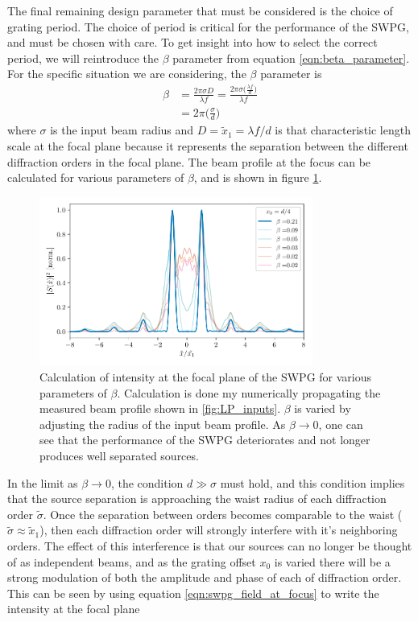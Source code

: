 The final remaining design parameter that must be considered is the choice of grating period. The choice of period is critical for the performance of the SWPG, and must be chosen with care.  To get insight into how to select the correct period, we will reintroduce the $\beta$ parameter from equation \ref{eqn:beta_parameter}.  For the specific situation we are considering, the $\beta$ parameter is
\begin{equation}
\label{eqn:beta_swpg}
	\begin{aligned}
		\beta &= \frac{2\pi \sigma D}{\lambda f} = \frac{2\pi\sigma\big(\frac{\lambda f}{d}\big)}{\lambda f}\\
		&= 2\pi\bigg(\frac{\sigma}{d}\bigg)
	\end{aligned}
\end{equation}
where $\sigma$ is the input beam radius and $D=\tilde{x}_1=\lambda f /d$ is that characteristic length scale at the focal plane because it represents the separation between the different diffraction orders in the focal plane.  The beam profile at the focus can be calculated for various parameters of $\beta$, and is shown in figure \ref{fig:intensity_vs_beta}.
\begin{figure}
	\centering
	\includegraphics[width=0.8\textwidth]{figures/Two_source/focus_intensity_beta_sigma.pdf}
	\caption[Intensity profiles at focal plane of a $0-\pi$ SWPG for various $\beta$ parameters]{Calculation of intensity at the focal plane of the SWPG for various parameters of $\beta$.  Calculation is done my numerically propagating the measured beam profile shown in \ref{fig:LP_inputs}.  $\beta$ is varied by adjusting the radius of the input beam profile.  As $\beta\rightarrow0$, one can see that the performance of the SWPG deteriorates and not longer produces well separated sources.}
	\label{fig:intensity_vs_beta}
\end{figure}
In the limit as $\beta\rightarrow0$, the condition $d\gg\sigma$ must hold, and this condition implies that the source separation is approaching the waist radius of each diffraction order $\tilde{\sigma}$.  Once the separation between orders becomes comparable to the waist ($\tilde{\sigma}\approx\tilde{x}_1$), then each diffraction order will strongly interfere with it's neighboring orders.  The effect of this interference is that our sources can no longer be thought of as independent beams, and as the grating offset $x_0$ is varied there will be a strong modulation of both the amplitude and phase of each of diffraction order.  This can be seen by using equation \ref{eqn:swpg_field_at_focus} to write the intensity at the focal plane

